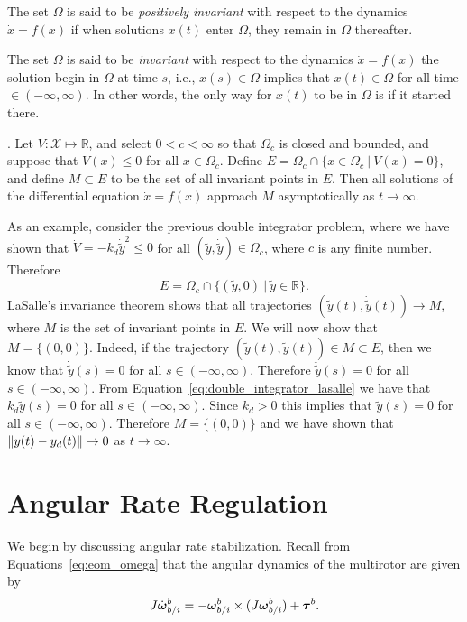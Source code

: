 \begin{definition}
The set $\Omega$ is said to be {\em positively invariant} with respect to the dynamics $\dot{x}=f(x)$ if when solutions $x(t)$ enter $\Omega$, they remain in $\Omega$ thereafter.  	
\end{definition}
\begin{definition}
The set $\Omega$ is said to be {\em invariant} with respect to the dynamics $\dot{x}=f(x)$ the solution begin in $\Omega$ at time $s$, i.e., $x(s)\in\Omega$ implies that $x(t)\in\Omega$ for all time $\in (-\infty, \infty)$.  In other words, the only way for $x(t)$ to be in $\Omega$ is if it started there.
\end{definition}
\begin{theorem} \label{thm:lasalle_invariance_theorem}.  
Let $V:\mathcal{X} \mapsto \mathbb{R}$, and select $0<c<\infty$ so that $\Omega_c$ is closed and bounded, and suppose that $\dot{V}(x)\leq 0$ for all $x\in\Omega_c$.
Define $E=\Omega_c\cap \{x\in\Omega_c ~|~ \dot{V}(x) = 0 \}$, and define $M\subset E$ to be the set of all invariant points in $E$.  Then all solutions of the differential equation $\dot{x}=f(x)$ approach $M$ asymptotically as $t\to\infty$.
\end{theorem}

As an example, consider the previous double integrator problem, where we have shown that $\dot{V}=-k_d\dot{\tilde{y}}^2\leq 0$ for all $(\tilde{y},\dot{\tilde{y}})\in\Omega_c$, where $c$ is any finite number.  Therefore
\[
E = \Omega_c \cap \{(\tilde{y}, 0) ~|~ \tilde{y}\in\mathbb{R} \}.
\]
LaSalle's invariance theorem shows that all trajectories $(\tilde{y}(t), \dot{\tilde{y}}(t)) \to M$, where $M$ is the set of invariant points in $E$.  We will now show that $M=\{(0,0)\}$.  Indeed, if the trajectory $(\tilde{y}(t), \dot{\tilde{y}}(t)) \in M \subset E$, then we know that $\dot{\tilde{y}}(s)=0$ for all $s\in (-\infty, \infty)$.  Therefore $\ddot{\tilde{y}}(s)=0$ for all $s\in (-\infty, \infty)$.  From Equation~\eqref{eq:double_integrator_lasalle} we have that $k_d\tilde{y}(s)=0$ for all $s\in (-\infty, \infty)$.  Since $k_d>0$ this implies that $\tilde{y}(s)=0$ for all $s\in (-\infty, \infty)$.  Therefore $M=\{(0,0)\}$ and we have shown that $\left\|y(t)-y_d(t)\right\|\to 0$ as $t\to\infty$.


\section{Angular Rate Regulation}
We begin by discussing angular rate stabilization.
Recall from Equations~\eqref{eq:eom_omega} that the angular dynamics of the multirotor are given by
\begin{equation}
	J\dot{\boldsymbol{\omega}}_{b/i}^b = -\boldsymbol{\omega}_{b/i}^b \times (J\boldsymbol{\omega}_{b/i}^b) + \boldsymbol{\tau}^b. 
\end{equation}

